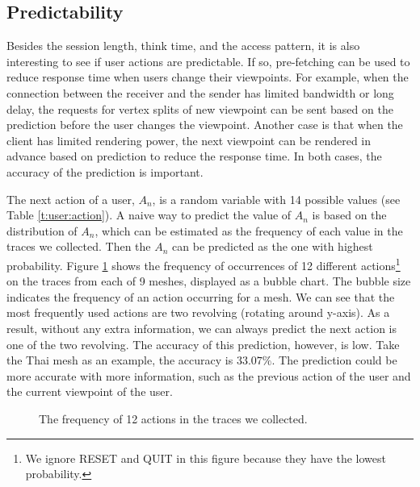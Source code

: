 \subsection{Predictability}
\label{ss:user:predictability}
Besides the session length, think time, and the access pattern,
it is also interesting to see if user actions are predictable. 
If so, pre-fetching can be used to reduce response time when
users change their viewpoints. For example, when the connection between the 
receiver and the sender has limited bandwidth
or long delay, the requests for vertex splits of new viewpoint 
can be sent based on the prediction before the user changes the viewpoint.
Another case is that when the client has limited
rendering power, the next viewpoint can be rendered
in advance based on prediction to reduce the response time. 
In both cases, the accuracy of the prediction is important.

The next action of a user, $A_n$, is a random variable with 14 possible values
(see Table \ref{t:user:action}). 
A naive way to predict the value of $A_n$ is based on the distribution 
of $A_n$, which can be estimated as the frequency of each value in the traces
we collected.  
Then the $A_n$ can be predicted as the one with highest probability.
Figure \ref{f:user:frequency}
shows the frequency of occurrences of 12 different actions\footnote{We ignore RESET and QUIT 
in this figure because they have the lowest probability.}
on the traces from each of 9 meshes,
displayed as a bubble chart. 
The bubble size indicates the frequency of an action occurring for a mesh.
We can see that the most frequently used actions are two revolving (rotating around y-axis). 
As a result, without any extra information, we can always predict the next action is 
one of the two revolving.
The accuracy of this prediction, however, is low. 
Take the Thai mesh as an example,
the accuracy is $33.07\%$. %
The prediction could be more accurate with more information,
such as the previous action of the user and the current viewpoint of the user.
\begin{figure}[htdp!]
    \centering
    \caption{The frequency of 12 actions in the traces we collected.}
    \label{f:user:frequency}
\end{figure}

